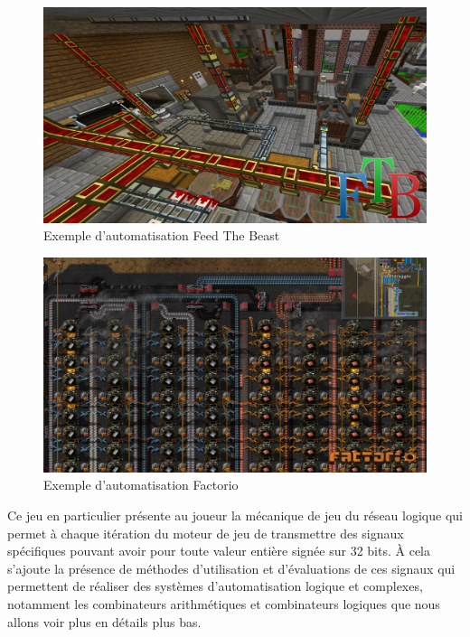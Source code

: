 \documentclass{scrreprt}
\begin{document}
    	\begin{figure}[h]
    		\centering
    		\includegraphics[width=0.8\linewidth]{pics/ftb-presentation.png}
    		
    		\caption{Exemple d'automatisation Feed The Beast}
    	\end{figure}
    
	    \begin{figure}[h]
	    	\centering
	    	\includegraphics[width=0.8\linewidth]{pics/factorio-presentation.png}
	    	
	    	\caption{Exemple d'automatisation Factorio}
	    \end{figure}
    
    	
    	Ce jeu en particulier présente au joueur la mécanique de jeu du réseau logique qui permet à chaque itération du moteur de jeu de transmettre des signaux spécifiques pouvant avoir pour toute valeur entière signée sur 32 bits.
    	À cela s'ajoute la présence de méthodes d'utilisation et d'évaluations de ces signaux qui permettent de réaliser des systèmes d'automatisation logique et complexes, notamment les combinateurs arithmétiques et combinateurs logiques que nous allons voir plus en détails plus bas.
    	
\end{document}
